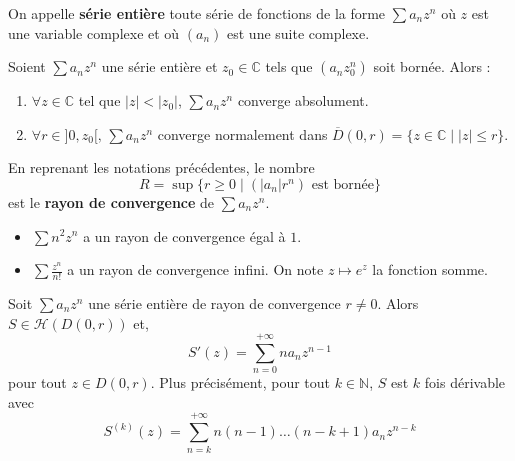   \begin{definition}
    On appelle \textbf{série entière} toute série de fonctions de la forme $\sum a_n z^n$ où $z$ est une variable complexe et où $(a_n)$ est une suite complexe.
  \end{definition}

  \begin{lemma}[Abel]
    Soient $\sum a_n z^n$ une série entière et $z_0 \in \mathbb{C}$ tels que $(a_n z_0^n)$ soit bornée. Alors :
    \begin{enumerate}[label=(\roman*)]
      \item $\forall z \in \mathbb{C}$ tel que $|z| < |z_0|$, $\sum a_n z^n$ converge absolument.
      \item $\forall r \in ]0,z_0[, \, \sum a_n z^n$ converge normalement dans $\overline{D}(0, r) = \{ z \in \mathbb{C} \mid |z| \leq r \}$.
    \end{enumerate}
  \end{lemma}

  \begin{definition}
    En reprenant les notations précédentes, le nombre
    \[ R = \sup \{ r \geq 0 \mid (|a_n|r^n) \text{ est bornée} \} \]
    est le \textbf{rayon de convergence} de $\sum a_n z^n$.
  \end{definition}


  \begin{example}
    \begin{itemize}
      \item $\sum n^2 z^n$ a un rayon de convergence égal à $1$.
      \item $\sum \frac{z^n}{n!}$ a un rayon de convergence infini. On note $z \mapsto e^z$ la fonction somme.
    \end{itemize}
  \end{example}


  \begin{proposition}
    Soit $\sum a_n z^n$ une série entière de rayon de convergence $r \neq 0$. Alors $S \in \mathcal{H}(D(0, r))$ et,
    \[ S'(z) = \sum_{n=0}^{+\infty} n a_n z^{n-1} \]
    pour tout $z \in D(0, r)$.
    \newpar
    Plus précisément, pour tout $k \in \mathbb{N}$, $S$ est $k$ fois dérivable avec
    \[ S^{(k)}(z) = \sum_{n=k}^{+\infty} n (n-1) \dots (n-k+1) a_n z^{n-k} \]
  \end{proposition}


